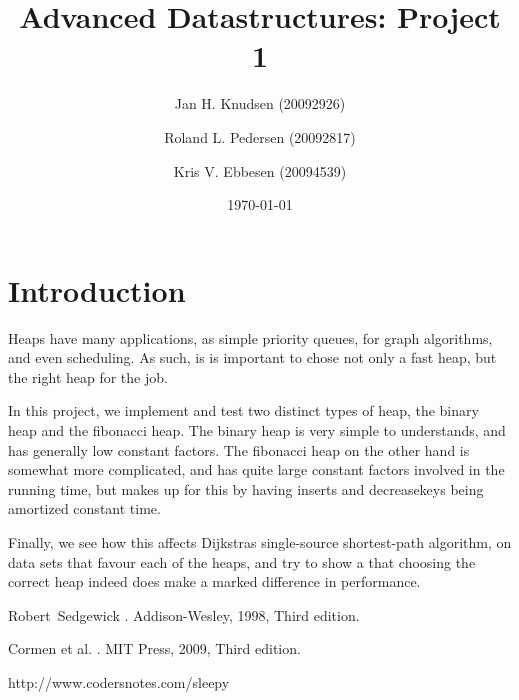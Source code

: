 \documentclass[a4paper, 12pt]{article}
\title{Advanced Datastructures: Project 1}
\date{\today}
\author{Jan H. Knudsen (20092926)
\and
Roland L. Pedersen (20092817)
\and
Kris V. Ebbesen (20094539)
}
\begin{document}
\maketitle

\newpage
\tableofcontents
\newpage

\section{Introduction}

Heaps have many applications, as  simple priority queues, for graph algorithms, and even scheduling. As such, is is important to chose not only a fast heap, but the right heap for the job.

In this project, we implement and test two distinct types of heap, the binary heap and the fibonacci heap. The binary heap is very simple to understands, and has generally low constant factors. The fibonacci heap on the other hand is somewhat more complicated, and has quite large constant factors involved in the running time, but makes up for this by having inserts and decreasekeys being amortized constant time.

Finally, we see how this affects Dijkstras single-source shortest-path algorithm, on data sets that favour each of the heaps, and try to show a that choosing the correct heap indeed does make a marked difference in performance.  
















\begin{thebibliography}{9}

Robert~Sedgewick
.
\newblock Addison-Wesley, 1998, Third edition.

Cormen et al.
.
\newblock MIT Press, 2009, Third edition.

http://www.codersnotes.com/sleepy



\end{thebibliography}
\end{document}
